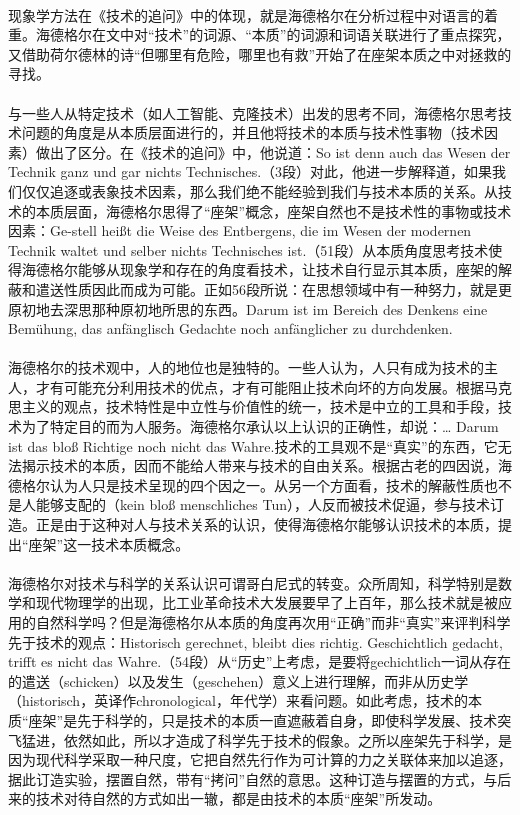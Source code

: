 \documentclass{article}
\begin{document}
		\paragraph{}
		现象学方法在《技术的追问》中的体现，就是海德格尔在分析过程中对语言的着重。海德格尔在文中对“技术”的词源、“本质”的词源和词语关联进行了重点探究，又借助荷尔德林的诗“但哪里有危险，哪里也有救”开始了在座架本质之中对拯救的寻找。
		\paragraph{}
与一些人从特定技术（如人工智能、克隆技术）出发的思考不同，海德格尔思考技术问题的角度是从本质层面进行的，并且他将技术的本质与技术性事物（技术因素）做出了区分。在《技术的追问》中，他说道：So ist denn auch das Wesen der Technik ganz und gar nichts Technisches.（3段）对此，他进一步解释道，如果我们仅仅追逐或表象技术因素，那么我们绝不能经验到我们与技术本质的关系。从技术的本质层面，海德格尔思得了“座架”概念，座架自然也不是技术性的事物或技术因素：Ge-stell heißt die Weise des Entbergens, die im Wesen der modernen Technik waltet und selber nichts Technisches ist.（51段）从本质角度思考技术使得海德格尔能够从现象学和存在的角度看技术，让技术自行显示其本质，座架的解蔽和遣送性质因此而成为可能。正如56段所说：在思想领域中有一种努力，就是更原初地去深思那种原初地所思的东西。Darum ist im Bereich des Denkens eine Bemühung, das anfänglisch Gedachte noch anfänglicher zu durchdenken.
		\paragraph{}
海德格尔的技术观中，人的地位也是独特的。一些人认为，人只有成为技术的主人，才有可能充分利用技术的优点，才有可能阻止技术向坏的方向发展。根据马克思主义的观点，技术特性是中立性与价值性的统一，技术是中立的工具和手段，技术为了特定目的而为人服务。海德格尔承认以上认识的正确性，却说：… Darum ist das bloß Richtige noch nicht das Wahre.技术的工具观不是“真实”的东西，它无法揭示技术的本质，因而不能给人带来与技术的自由关系。根据古老的四因说，海德格尔认为人只是技术呈现的四个因之一。从另一个方面看，技术的解蔽性质也不是人能够支配的（kein bloß menschliches Tun），人反而被技术促逼，参与技术订造。正是由于这种对人与技术关系的认识，使得海德格尔能够认识技术的本质，提出“座架”这一技术本质概念。
		\paragraph{}
海德格尔对技术与科学的关系认识可谓哥白尼式的转变。众所周知，科学特别是数学和现代物理学的出现，比工业革命技术大发展要早了上百年，那么技术就是被应用的自然科学吗？但是海德格尔从本质的角度再次用“正确”而非“真实”来评判科学先于技术的观点：Historisch gerechnet, bleibt dies richtig. Geschichtlich gedacht, trifft es nicht das Wahre.（54段）从“历史”上考虑，是要将gechichtlich一词从存在的遣送（schicken）以及发生（geschehen）意义上进行理解，而非从历史学（historisch，英译作chronological，年代学）来看问题。如此考虑，技术的本质“座架”是先于科学的，只是技术的本质一直遮蔽着自身，即使科学发展、技术突飞猛进，依然如此，所以才造成了科学先于技术的假象。之所以座架先于科学，是因为现代科学采取一种尺度，它把自然先行作为可计算的力之关联体来加以追逐，据此订造实验，摆置自然，带有“拷问”自然的意思。这种订造与摆置的方式，与后来的技术对待自然的方式如出一辙，都是由技术的本质“座架”所发动。
\end{document}
